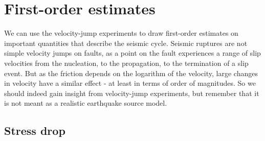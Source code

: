 \documentclass[letterpaper,12pt,]{memoir}
\begin{document}
\clearpage


\section{First-order estimates}

We can use the velocity-jump experiments to draw first-order estimates on important quantities that describe the seismic cycle. Seismic ruptures are not simple velocity jumps on faults, as a point on the fault experiences a range of slip velocities from the nucleation, to the propagation, to the termination of a slip event. But as the friction depends on the logarithm of the velocity, large changes in velocity have a similar effect - at least in terms of order of magnitudes. So we should indeed gain insight from velocity-jump experiments, but remember that it is not meant as a realistic earthquake source model.

\subsection{Stress drop}
\end{document}

